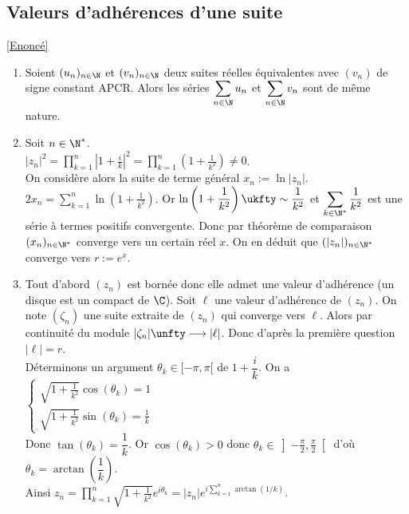 \documentclass{book}
\begin{document}
	\subsection{Valeurs d'adhérences d'une suite }
	\label{Valeurs d'adhérences d'une suite corrigé}
	\textcolor{blue}{\hyperref[Valeurs d'adhérences d'une suite]{[Enoncé]}}
	\begin{enumerate}[leftmargin=*]
		\item Soient $(u_n)_{n\in \N}$ et $(v_n)_{n\in \N}$ deux suites réelles équivalentes avec $(v_n)$ de signe constant APCR. Alors les séries $\displaystyle\sum_{n\in \N}u_n$ et $\displaystyle\sum_{n\in \N}v_n$ sont de même nature.
		\item Soit $n\in \N^*$.\\
		$|z_n|^2=\displaystyle\prod_{k=1}^n\left|1+\frac{i}{k}\right|^2=\prod_{k=1}^n\left(1+\frac{1}{k^2}\right)\ne 0$.\\
		On considère alors la suite de terme général $x_n:=\ln|z_n|$.\\
		$2x_n=\displaystyle\sum_{k=1}^n\ln\left(1+\frac{1}{k^2}\right)$. Or $\displaystyle\ln\left(1+\frac{1}{k^2}\right)\ukfty\sim\frac{1}{k^2}$ et $\displaystyle\sum_{k\in \N^*}\frac{1}{k^2}$ est une série à termes positifs convergente. Donc par théorème de comparaison $(x_n)_{n\in \N^*}$ converge vers un certain réel $x$. On en déduit que $(|z_n|)_{n\in \N^*}$ converge vers $r:=e^x$.
		\item Tout d'abord $(z_n)$ est bornée donc elle admet une valeur d'adhérence (un disque est un compact de $\C$). Soit $\ell$ une valeur d'adhérence de $(z_n)$. On note $(\zeta_n)$ une suite extraite de $(z_n)$ qui converge vers $\ell$. Alors par continuité du module $|\zeta_n|\unfty\longrightarrow|\ell|$. Donc d'après la première question $|\ell|=r$.\\
		Déterminons un argument $\theta_k\in [-\pi,\pi[$ de $1+\dfrac{i}{k}$. On a $\begin{cases}
			\displaystyle\sqrt{1+\frac{1}{k^2}}\cos(\theta_k)=1\\
			\displaystyle\sqrt{1+\frac{1}{k^2}}\sin(\theta_k)=\frac{1}{k}
		\end{cases}$\\
		Donc $\tan(\theta_k)=\dfrac{1}{k}$. Or $\cos(\theta_k)>0$ donc $\theta_k\in \displaystyle\left]-\frac{\pi}{2},\frac{\pi}{2}\right[$ d'où $\theta_k=\arctan\left(\dfrac{1}{k}\right)$.\\
		Ainsi $z_n=\displaystyle\prod_{k=1}^n\sqrt{1+\frac{1}{k^2}}e^{i\theta_k}=|z_n|e^{i\sum\limits_{k=1}^n\arctan(1/k)}$.\\

\end{enumerate}
\end{document}
